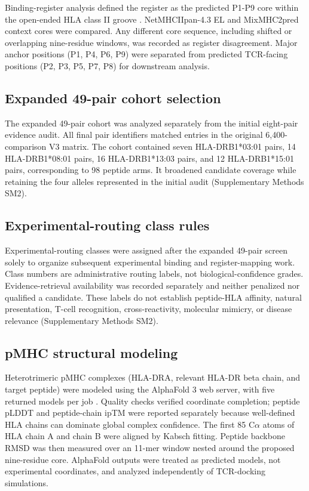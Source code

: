 \documentclass[11pt]{article}
\begin{document}
Binding-register analysis defined the register as the predicted P1-P9 core within the open-ended HLA class II groove \cite{brown}. NetMHCIIpan-4.3 EL and MixMHC2pred context cores were compared. Any different core sequence, including shifted or overlapping nine-residue windows, was recorded as register disagreement. Major anchor positions (P1, P4, P6, P9) were separated from predicted TCR-facing positions (P2, P3, P5, P7, P8) for downstream analysis.

\subsection{Expanded 49-pair cohort selection}
The expanded 49-pair cohort was analyzed separately from the initial eight-pair evidence audit. All final pair identifiers matched entries in the original 6,400-comparison V3 matrix. The cohort contained seven HLA-DRB1*03:01 pairs, 14 HLA-DRB1*08:01 pairs, 16 HLA-DRB1*13:03 pairs, and 12 HLA-DRB1*15:01 pairs, corresponding to 98 peptide arms. It broadened candidate coverage while retaining the four alleles represented in the initial audit (Supplementary Methods SM2).

\subsection{Experimental-routing class rules}
Experimental-routing classes were assigned after the expanded 49-pair screen solely to organize subsequent experimental binding and register-mapping work. Class numbers are administrative routing labels, not biological-confidence grades. Evidence-retrieval availability was recorded separately and neither penalized nor qualified a candidate. These labels do not establish peptide-HLA affinity, natural presentation, T-cell recognition, cross-reactivity, molecular mimicry, or disease relevance (Supplementary Methods SM2).

\subsection{pMHC structural modeling}
Heterotrimeric pMHC complexes (HLA-DRA, relevant HLA-DR beta chain, and target peptide) were modeled using the AlphaFold 3 web server, with five returned models per job \cite{af3}. Quality checks verified coordinate completion; peptide pLDDT and peptide-chain ipTM were reported separately because well-defined HLA chains can dominate global complex confidence. The first 85 C$\alpha$ atoms of HLA chain A and chain B were aligned by Kabsch fitting. Peptide backbone RMSD was then measured over an 11-mer window nested around the proposed nine-residue core. AlphaFold outputs were treated as predicted models, not experimental coordinates, and analyzed independently of TCR-docking simulations.
\end{document}
